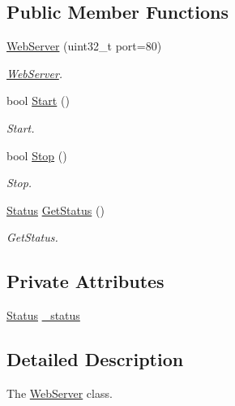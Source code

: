 \subsection*{Public Member Functions}
\begin{DoxyCompactItemize}
\item 
\hyperlink{classWebServer_a456687b9d497b2810e3660f08bfa8462}{Web\+Server} (uint32\+\_\+t port=80)
\begin{DoxyCompactList}\small\item\em \hyperlink{classWebServer}{Web\+Server}. \end{DoxyCompactList}\item 
bool \hyperlink{classWebServer_a0ce9a771f7adb84c47c748a9a19444fe}{Start} ()
\begin{DoxyCompactList}\small\item\em Start. \end{DoxyCompactList}\item 
bool \hyperlink{classWebServer_af27f38bac6c5f718ae25deeb3369fb8a}{Stop} ()
\begin{DoxyCompactList}\small\item\em Stop. \end{DoxyCompactList}\item 
\hyperlink{classWebServer_a350f14f5d1522610502fb95f346e4a3c}{Status} \hyperlink{classWebServer_a191564ab545bdb1aa90ed40cfa966836}{Get\+Status} ()
\begin{DoxyCompactList}\small\item\em Get\+Status. \end{DoxyCompactList}\end{DoxyCompactItemize}
\subsection*{Private Attributes}
\begin{DoxyCompactItemize}
\item 
\hyperlink{classWebServer_a350f14f5d1522610502fb95f346e4a3c}{Status} \hyperlink{classWebServer_acde07bc97f932a6690ab659625309562}{\+\_\+status}
\end{DoxyCompactItemize}


\subsection{Detailed Description}
The \hyperlink{classWebServer}{Web\+Server} class. 


